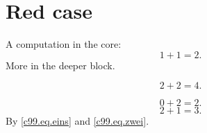\chapter{Red case}\label{c99}

A computation in the core:
\begin{equation}\label{c99.eq.eins}
  1 + 1 = 2.
\end{equation}
More in the deeper block.

\begin{vertiefung}[id=c99.v1, titel={Deeper}, wozu={Shows a second computation.},
    voraussetzung={Equation~\eqref{c99.eq.eins}.}, zurueck={It stays at two.}]
  \begin{equation}\label{c99.eq.tief}
    2 + 2 = 4.
  \end{equation}
\end{vertiefung}

\begin{equation}\label{c99.eq.eins}
  0 + 2 = 2.
\end{equation}
\begin{equation}\label{c99.eq.zwei}
  2 + 1 = 3.
\end{equation}
By \eqref{c99.eq.eins} and \eqref{c99.eq.zwei}.

